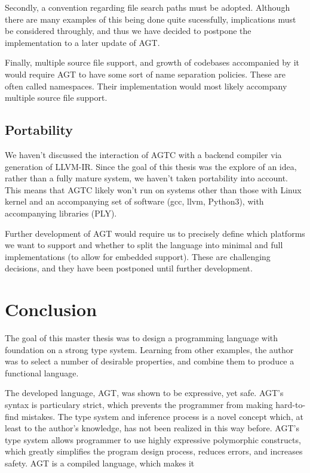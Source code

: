 \documentclass[times, utf8, diplomski]{fer}
\theoremstyle{definition}
\begin{document}
Secondly, a convention regarding file search paths must be adopted. Although there are many
examples of this being done quite sucessfully, implications must be considered throughly,
and thus we have decided to postpone the implementation to a later update of AGT.

Finally, multiple source file support, and growth of codebases accompanied by it would require
AGT to have some sort of name separation policies. These are often called namespaces.
Their implementation would most likely accompany multiple source file support.

\section{Portability}

We haven't discussed the interaction of AGTC with a backend compiler via generation of LLVM-IR.
Since the goal of this thesis was the explore of an idea, rather than a fully mature system,
we haven't taken portability into account. This means that AGTC likely won't run on systems
other than those with Linux kernel and an accompanying set of software (gcc, llvm, Python3),
with accompanying libraries (PLY).

Further development of AGT would require us to precisely define which platforms we want to support and
whether to split the language into minimal and full implementations (to allow for embedded support).
These are challenging decisions, and they have been postponed until further development.

\chapter{Conclusion}\label{chap:concl}

The goal of this master thesis was to design a programming language with foundation
on a strong type system. Learning from other examples, the author was to select a number
of desirable properties, and combine them to produce a functional language.

The developed language, AGT, was shown to be expressive, yet safe. 
AGT's syntax is particulary strict, which prevents the programmer from making hard-to-find mistakes.
The type system and inference process is a novel concept which, at least to the author's knowledge,
has not been realized in this way before. AGT's type system allows programmer to use
highly expressive polymorphic constructs, which greatly simplifies the program design process,
reduces errors, and increases safety. AGT is a compiled language, which makes it 
\end{document}
